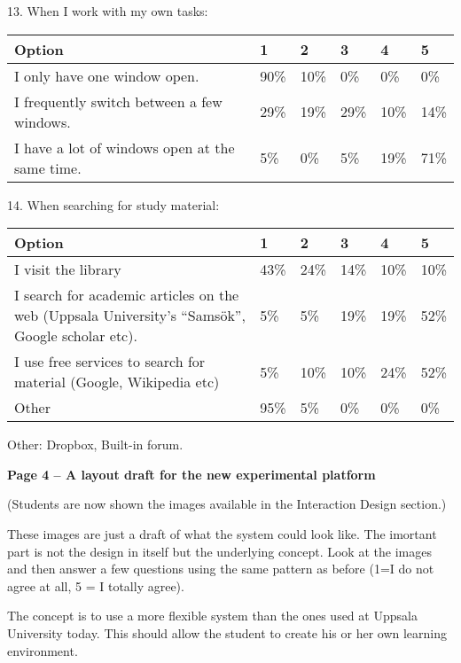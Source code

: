 13. When I work with my own tasks:

\begin{center}
    \begin{tabular}{ | l | l | l | l | l | l |}
    \hline
    Option & 1 & 2 & 3 & 4 & 5 \\ \hline
	I only have one window open. & 90\% & 10\% & 0\% & 0\% & 0\% \\ \hline
	I frequently switch between a few windows. & 29\% & 19\% & 29\% & 10\% & 14\% \\ \hline
	I have a lot of  windows open at the same time. & 5\% & 0\% & 5\% & 19\% & 71\%\\ \hline
    \end{tabular}
\end{center}
	
14. When searching for study material:

\begin{center}
    \begin{tabular}{ | p{8cm} | l | l | l | l | l |}
    \hline
    Option & 1 & 2 & 3 & 4 & 5 \\ \hline
	I visit the library & 43\% & 24\% & 14\% & 10\% & 10\% \\ \hline
	I search for academic articles on the web (Uppsala University's “Samsök”, Google scholar etc). & 5\% & 5\% & 19\% & 19\% & 52\% \\ \hline
	I use free services to search for material (Google, Wikipedia etc) & 5\% & 10\% & 10\% & 24\% & 52\%\\ \hline
	Other & 95\%& 5\% & 0\% & 0\% & 0\% \\ \hline
    \end{tabular}
    Other: Dropbox, Built-in forum.
\end{center}

\textbf {Page 4 – A layout draft for the new experimental platform}

(Students are now shown the images available in the Interaction Design section.)

These images are just a draft of what the system could look like. The imortant part is not the design in itself but the underlying concept.
Look at the images and then answer a few questions using the same pattern as before (1=I do not agree at all, 5 = I totally agree).

The concept is to use a more flexible system than the ones used at Uppsala University today. This should allow the student to create his or her own learning environment.

